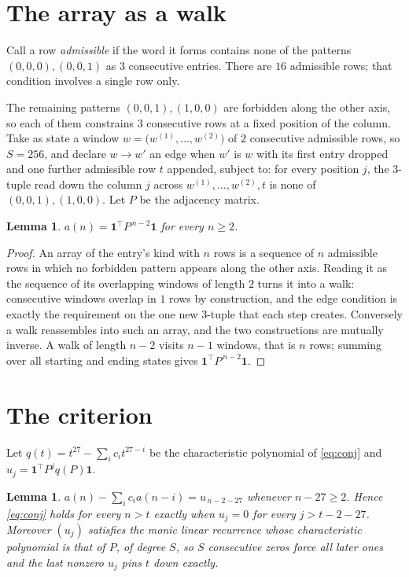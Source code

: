 \documentclass[11pt,a4paper]{article}
\theoremstyle{plain}
\newtheorem{lemma}[theorem]{Lemma}
\theoremstyle{definition}
\begin{document}
\section{The array as a walk}

Call a row \emph{admissible} if the word it forms contains none of the patterns
$(0,0,0), (0,0,1)$ as $3$ consecutive entries. There are $16$ admissible rows; that condition
involves a single row only.

The remaining patterns $(0,0,1), (1,0,0)$ are forbidden along the other axis, so each of them
constrains $3$ consecutive rows at a fixed position of the column. Take as state a
window $w=\bigl(w^{(1)},\dots,w^{(2)}\bigr)$ of $2$ consecutive admissible
rows, so $S=256$, and declare $w\to w'$ an edge when $w'$ is $w$ with its first entry
dropped and one further admissible row $t$ appended, subject to: for every position
$j$, the $3$-tuple read down the column $j$ across $w^{(1)},\dots,w^{(2)},t$
is none of $(0,0,1), (1,0,0)$. Let $P$ be the adjacency matrix.

\begin{lemma}\label{lem:walk}
$a(n)=\mathbf{1}^{\!\top}P^{\,n-2}\mathbf{1}$ for every $n\ge2$.
\end{lemma}

\begin{proof}
An array of the entry's kind with $n$ rows is a sequence of $n$ admissible rows in
which no forbidden pattern appears along the other axis. Reading it as the sequence of its
overlapping windows of length $2$ turns it into a walk: consecutive windows overlap in
$1$ rows by construction, and the edge condition is exactly the requirement on the one
new $3$-tuple that each step creates. Conversely a walk reassembles into such an array,
and the two constructions are mutually inverse. A walk of length $n-2$ visits $n-1$
windows, that is $n$ rows; summing over all starting and ending states gives
$\mathbf{1}^{\!\top}P^{\,n-2}\mathbf{1}$.
\end{proof}

\section{The criterion}

Let $q(t)=t^{27}-\sum_i c_i t^{27-i}$ be the characteristic polynomial of
\eqref{eq:conj} and $u_j=\mathbf{1}^{\!\top}P^{j}q(P)\mathbf{1}$.

\begin{lemma}\label{lem:crit}
$a(n)-\sum_i c_i a(n-i)=u_{\,n-2-27}$ whenever $n-27\ge2$. Hence
\eqref{eq:conj} holds for every $n>t$ exactly when $u_j=0$ for every
$j>t-2-27$. Moreover $(u_j)$ satisfies the monic linear recurrence whose
characteristic polynomial is that of $P$, of degree $S$, so $S$ consecutive zeros force all
later ones and the last nonzero $u_j$ pins $t$ down exactly.
\end{lemma}
\end{document}

